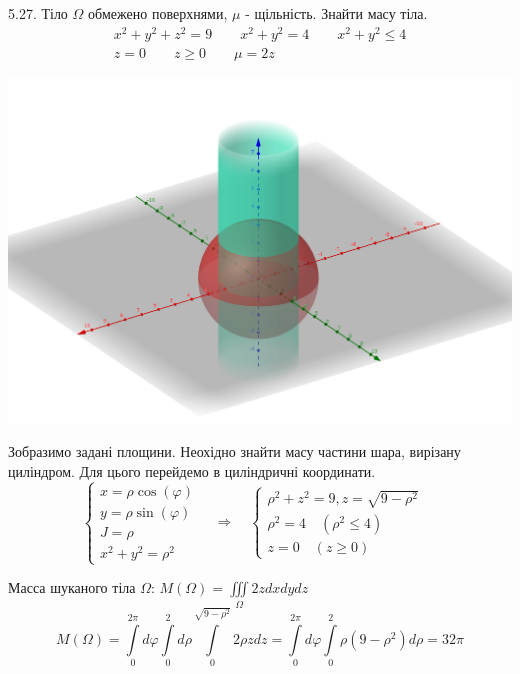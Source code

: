 \documentclass[14pt,a4paper]{scrartcl}
\theoremstyle{definition}
\theoremstyle{remark}
\theoremstyle{definition}
\theoremstyle{definition}
\begin{document}
\pagebreak

5.27. Тіло $\Omega$ обмежено поверхнями, $\mu$ - щільність. Знайти масу тіла.
$$
\begin{gathered}
x^2 + y^2 + z^2 = 9 \qquad x^2 + y^2 = 4\qquad x^2 + y^2 \leq 4\\
z = 0 \qquad z\geq 0 \qquad \mu = 2z
\end{gathered}
$$
\begin{center} \includegraphics[scale=0.3]{7.png} \end{center}
Зобразимо задані площини. Неохідно знайти масу частини шара, вирізану циліндром. Для цього перейдемо в циліндричні координати.
$$
\left\lbrace
\begin{gathered}
  x = \rho \cos{(\varphi)}\\
	y = \rho \sin{(\varphi)}\\
	J = \rho\\
	x^2 + y^2 = \rho^2
\end{gathered}
 \right.\quad
 \Longrightarrow
 \quad
 \left\lbrace
 \begin{gathered}
   \rho^2 + z^2 = 9, z = \sqrt{9 - \rho^2}\\
 	\rho^2 = 4\quad (\rho^2 \leq 4)\\
 	z= 0 \quad(z\geq 0)
 \end{gathered}
  \right.\quad
$$

Масса шуканого тіла $\Omega$: $ M(\Omega) =  \iiint\limits_{\Omega}^{}{2zdxdydz}$
$$
 M(\Omega) = \int\limits_{0}^{2\pi}{ d \varphi \int\limits_{0}^{2}{  d\rho \int\limits_{0}^{ \sqrt{9 - \rho^2}}{2\rho z dz}}} =
 \int\limits_{0}^{2\pi}{ d \varphi \int\limits_{0}^{2}{ \rho(9-\rho^2) d\rho }} = 32 \pi
$$
\end{document}

